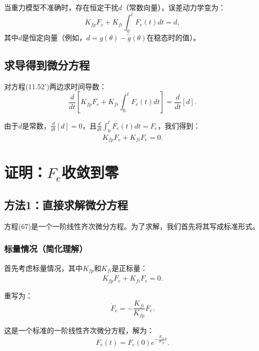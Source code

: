 \documentclass{article}
\begin{document}
当重力模型不准确时，存在恒定干扰$d$（常数向量），误差动力学变为：
\begin{equation}
K_{fp}F_e + K_{fi}\int_0^t F_e(t)dt = d, \tag{11.52'}
\end{equation}
其中$d$是恒定向量（例如，$d = g(\theta) - \tilde{g}(\theta)$在稳态时的值）。

\subsection{求导得到微分方程}

对方程(11.52')两边求时间导数：
\begin{equation}
\frac{d}{dt}\left[K_{fp}F_e + K_{fi}\int_0^t F_e(t)dt\right] = \frac{d}{dt}[d].
\end{equation}

由于$d$是常数，$\frac{d}{dt}[d] = 0$，且$\frac{d}{dt}\int_0^t F_e(t)dt = F_e$，我们得到：
\begin{equation}
K_{fp}\dot{F}_e + K_{fi}F_e = 0. \tag{67}
\end{equation}

\section{证明：$F_e$收敛到零}

\subsection{方法1：直接求解微分方程}

方程(67)是一个一阶线性齐次微分方程。为了求解，我们首先将其写成标准形式。

\subsubsection{标量情况（简化理解）}

首先考虑标量情况，其中$K_{fp}$和$K_{fi}$是正标量：
\begin{equation}
K_{fp}\dot{F}_e + K_{fi}F_e = 0.
\end{equation}

重写为：
\begin{equation}
\dot{F}_e = -\frac{K_{fi}}{K_{fp}}F_e.
\end{equation}

这是一个标准的一阶线性齐次微分方程，解为：
\begin{equation}
F_e(t) = F_e(0)e^{-\frac{K_{fi}}{K_{fp}}t}.
\end{equation}
\end{document}
